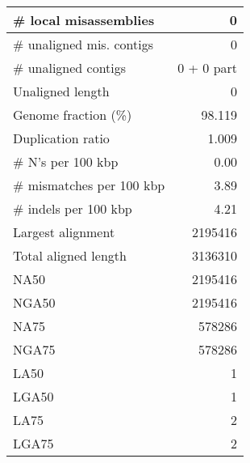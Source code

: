 \documentclass[12pt,a4paper]{article}
\begin{document}
\begin{table}[ht]
\begin{center}
\begin{tabular}{|l*{1}{|r}|}
\# local misassemblies & 0 \\ \hline
\# unaligned mis. contigs & 0 \\ \hline
\# unaligned contigs & 0 + 0 part \\ \hline
Unaligned length & 0 \\ \hline
Genome fraction (\%) & 98.119 \\ \hline
Duplication ratio & 1.009 \\ \hline
\# N's per 100 kbp & 0.00 \\ \hline
\# mismatches per 100 kbp & 3.89 \\ \hline
\# indels per 100 kbp & 4.21 \\ \hline
Largest alignment & 2195416 \\ \hline
Total aligned length & 3136310 \\ \hline
NA50 & 2195416 \\ \hline
NGA50 & 2195416 \\ \hline
NA75 & 578286 \\ \hline
NGA75 & 578286 \\ \hline
LA50 & 1 \\ \hline
LGA50 & 1 \\ \hline
LA75 & 2 \\ \hline
LGA75 & 2 \\ \hline
\end{tabular}
\end{center}
\end{table}
\end{document}
